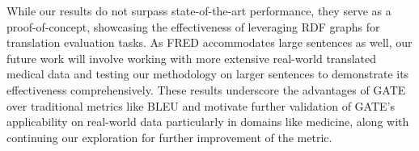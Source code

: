 \documentclass[runningheads]{llncs}
\begin{document}
While our results do not surpass state-of-the-art performance, they serve as a proof-of-concept, showcasing the effectiveness of leveraging RDF graphs for translation evaluation tasks. As FRED accommodates large sentences as well, our future work will involve working with more extensive real-world translated medical data and testing our methodology on larger sentences to demonstrate its effectiveness comprehensively. These results underscore the advantages of GATE over traditional metrics like BLEU and motivate further validation of GATE's applicability on real-world data particularly in domains like medicine, along with continuing our exploration for further improvement of the metric. 






\end{document}
